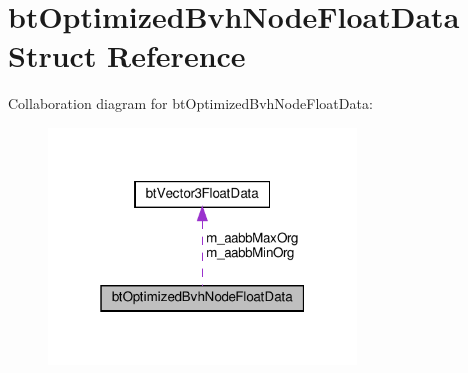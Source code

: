 \hypertarget{structbtOptimizedBvhNodeFloatData}{}\section{bt\+Optimized\+Bvh\+Node\+Float\+Data Struct Reference}
\label{structbtOptimizedBvhNodeFloatData}


Collaboration diagram for bt\+Optimized\+Bvh\+Node\+Float\+Data\+:
\nopagebreak
\begin{figure}[H]
\begin{center}
\leavevmode
\includegraphics[width=232pt]{structbtOptimizedBvhNodeFloatData__coll__graph}
\end{center}
\end{figure}
